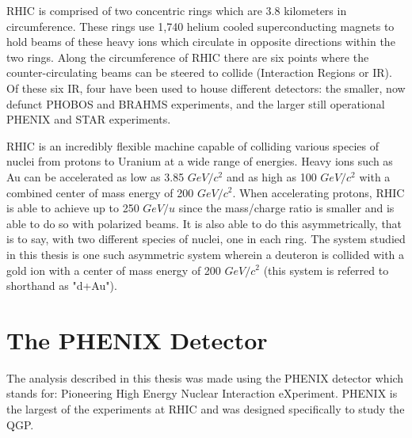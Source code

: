 RHIC is comprised of two concentric rings which are 3.8 kilometers in circumference.  These rings use 1,740 helium cooled superconducting magnets to hold beams of these heavy ions which circulate in opposite directions within the two rings.  Along the circumference of RHIC there are six points where the counter-circulating beams can be steered to collide (Interaction Regions or IR). Of these six IR, four have been used to house different detectors: the smaller, now defunct PHOBOS and BRAHMS experiments, and the larger still operational PHENIX and STAR experiments.  

RHIC is an incredibly flexible machine capable of colliding various species of nuclei from protons to Uranium \citep{EBISupgrade} at a wide range of energies.  Heavy ions such as Au can be accelerated as low as 3.85 $GeV/c^{2}$ and as high as 100 $GeV/c^{2}$ \citep{RHIClum} with a combined center of mass energy of 200 $GeV/c^{2}$.  When accelerating protons, RHIC is able to achieve up to 250 $GeV/u$ since the mass/charge ratio is smaller and is able to do so with polarized beams. It is also able to do this asymmetrically, that is to say, with two different species of nuclei, one in each ring.  The system studied in this thesis is one such asymmetric system wherein a deuteron is collided with a gold ion with a center of mass energy of 200 $GeV/c^{2}$ (this system is referred to shorthand as "d+Au").

\section{The PHENIX Detector}

\indent The analysis described in this thesis was made using the PHENIX detector which stands for: Pioneering High Energy Nuclear Interaction eXperiment. PHENIX is the largest of the experiments at RHIC and was designed specifically to study the QGP.  

